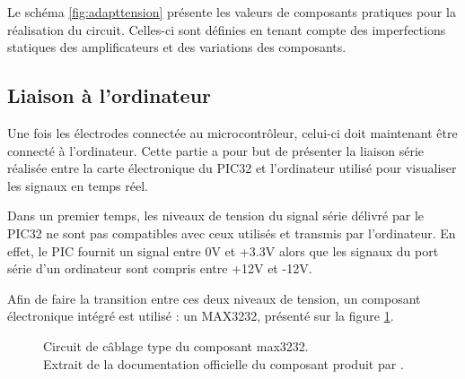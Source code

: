 \documentclass[letterpaper, twoside, 12pt, memoire, creativecommons, hyperref]{thETS}
\begin{document}
Le schéma \ref{fig:adapttension} présente les valeurs de composants pratiques pour la réalisation du circuit. Celles-ci sont définies en tenant compte des imperfections statiques des amplificateurs et des variations des composants.


\subsection{Liaison à l'ordinateur}

Une fois les électrodes connectée au microcontrôleur, celui-ci doit maintenant être connecté à l'ordinateur. Cette partie a pour but de présenter la liaison série réalisée entre la carte électronique du PIC32 et l'ordinateur utilisé pour visualiser les signaux en temps réel.

Dans un premier temps, les niveaux de tension du signal série délivré par le PIC32 ne sont pas compatibles avec ceux utilisés et transmis par l'ordinateur. En effet, le PIC fournit un signal entre 0V et +3.3V alors que les signaux du port série d'un ordinateur sont compris entre +12V et -12V. 

Afin de faire la transition entre ces deux niveaux de tension, un composant électronique intégré est utilisé : un MAX3232, présenté sur la figure \ref{fig:max3232}.

\begin{figure}
	\centering
	\caption{Circuit de câblage type du composant max3232. \\Extrait de la documentation officielle du composant produit par \cite{MAXIM3232}.}
	\label{fig:max3232}
\end{figure}
\end{document}
